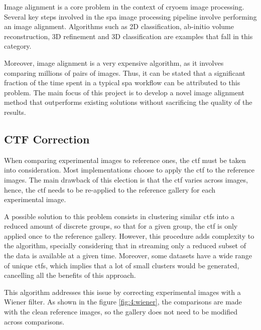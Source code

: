 \documentclass[../main.tex]{subfiles}
\begin{document}
Image alignment is a core problem in the context of \gls{cryoem} image processing. Several key steps involved in the \gls{spa} image processing pipeline involve performing an image alignment. Algorithms such as 2D classification, ab-initio volume reconstruction, 3D refinement and 3D classification are examples that fall in this category.

Moreover, image alignment is a very expensive algorithm, as it involves comparing millions of pairs of images. Thus, it can be stated that a significant fraction of the time spent in a typical \gls{spa} workflow can be attributed to this problem. The main focus of this project is to develop a novel image alignment method that outperforms existing solutions without sacrificing the quality of the results.



\subsection{CTF Correction}
When comparing experimental images to reference ones, the \gls{ctf} must be taken into consideration. Most implementations choose to apply the \gls{ctf} to the reference images. The main drawback of this election is that the \gls{ctf} varies across images, hence, the \gls{ctf} needs to be re-applied to the reference gallery for each experimental image\cite{scheres2005}.

A possible solution to this problem consists in clustering similar \glspl{ctf} into a reduced amount of discrete groups, so that for a given group, the \gls{ctf} is only applied once to the reference gallery. However, this procedure adds complexity to the algorithm, specially considering that in streaming only a reduced subset of the data is available at a given time. Moreover, some datasets have a wide range of unique \glspl{ctf}, which implies that a lot of small clusters would be generated, cancelling all the benefits of this approach.

This algorithm addresses this issue by correcting experimental images with a Wiener filter. As shown in the figure \ref{fig:4:wiener}, the comparisons are made with the clean reference images, so the gallery does not need to be modified across comparisons.
\end{document}
